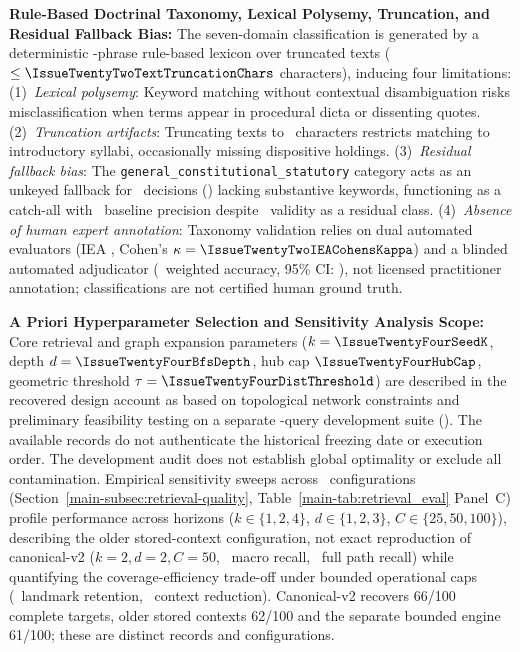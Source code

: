 \item \textbf{Rule-Based Doctrinal Taxonomy, Lexical Polysemy, Truncation, and Residual Fallback Bias:}
The seven-domain classification is generated by a deterministic \IssueTwentyTwoTotalLexiconPhrases-phrase rule-based lexicon over truncated texts ($\le \IssueTwentyTwoTextTruncationChars$ characters), inducing four limitations: (1)~\textit{Lexical polysemy}: Keyword matching without contextual disambiguation risks misclassification when terms appear in procedural dicta or dissenting quotes. (2)~\textit{Truncation artifacts}: Truncating texts to \IssueTwentyTwoTextTruncationChars\ characters restricts matching to introductory syllabi, occasionally missing dispositive holdings. (3)~\textit{Residual fallback bias}: The \texttt{general\_constitutional\_statutory} category acts as an unkeyed fallback for \IssueTwentyTwoGeneralConstitutionalCorpus\ decisions (\IssueTwentyTwoGeneralConstitutionalCorpusPct) lacking substantive keywords, functioning as a catch-all with \IssueTwentyTwoGeneralConstitutionalBaselineAcc\ baseline precision despite \IssueTwentyTwoFallbackValidityPct\ validity as a residual class. (4)~\textit{Absence of human expert annotation}: Taxonomy validation relies on dual automated evaluators (IEA \IssueTwentyTwoIEARawAgreement, Cohen's $\kappa=\IssueTwentyTwoIEACohensKappa$) and a blinded automated adjudicator (\IssueTwentyTwoHorvitzThompsonAccuracy\ weighted accuracy, 95\% CI: \IssueTwentyTwoHorvitzThompsonCI), not licensed practitioner annotation; classifications are not certified human ground truth.

\item \textbf{A Priori Hyperparameter Selection and Sensitivity Analysis Scope:} Core retrieval and graph expansion parameters ($k=\IssueTwentyFourSeedK$, depth $d=\IssueTwentyFourBfsDepth$, hub cap $\IssueTwentyFourHubCap$, geometric threshold $\tau=\IssueTwentyFourDistThreshold$) are described in the recovered design account as based on topological network constraints and preliminary feasibility testing on a separate \IssueTwentyFourDevQueryCount-query development suite (\IssueTwentyFourDevDate). The available records do not authenticate the historical freezing date or execution order. The development audit does not establish global optimality or exclude all contamination. Empirical sensitivity sweeps across \IssueTwentySixConfigCount\ configurations (Section~\ref{main-subsec:retrieval-quality}, Table~\ref{main-tab:retrieval_eval} Panel~C) profile performance across horizons ($k \in \{1,2,4\}$, $d \in \{1,2,3\}$, $C \in \{25,50,100\}$), describing the older stored-context configuration, not exact reproduction of canonical-v2 ($k=2, d=2, C=50$, \IssueTwentySixHistMacro\ macro recall, \IssueTwentySixHistFullPath\ full path recall) while quantifying the coverage-efficiency trade-off under bounded operational caps (\IssueTwentySixGoldRetentionPct\ landmark retention, \IssueTwentySixContextReductionPct\ context reduction). Canonical-v2 recovers 66/100 complete targets, older stored contexts 62/100 and the separate bounded engine 61/100; these are distinct records and configurations.

